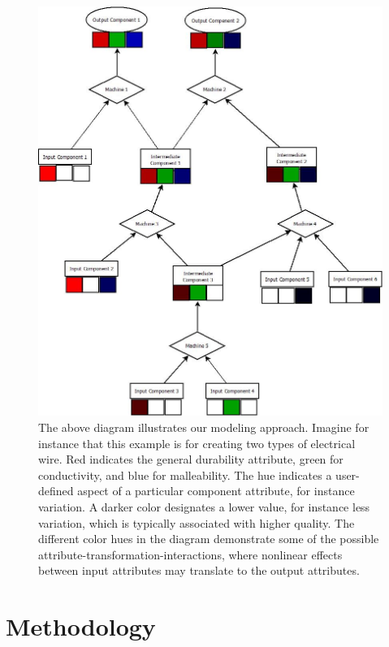 \documentclass{IEEEtran}
\begin{document}
\begin{figure}[!t]
\centerline{\includegraphics[width=\columnwidth]{Diagram1.jpeg}}
\caption{The above diagram illustrates our modeling approach. Imagine for instance that this example is for creating two types of electrical wire. Red indicates the general durability attribute, green for conductivity, and blue for malleability. The hue indicates a user-defined aspect of a particular component attribute, for instance variation. A darker color designates a lower value, for instance less variation, which is typically associated with higher quality. The different color hues in the diagram demonstrate some of the possible attribute-transformation-interactions, where nonlinear effects between input attributes may translate to the output attributes.}
\label{fig1}
\end{figure}
\section{Methodology}
\end{document}
